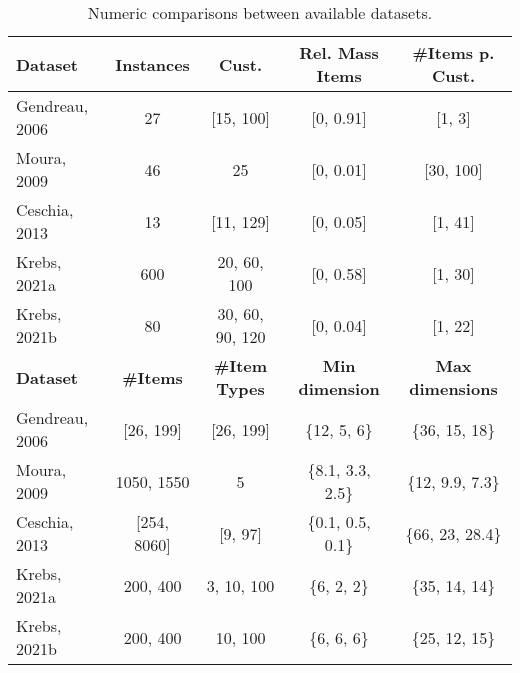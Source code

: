 \begin{table}[h]
    \centering
    \small
    \begin{tabular}{@{}lcccc@{}}
        \toprule
        \textbf{Dataset} & \textbf{Instances} & \textbf{Cust.}        & \textbf{Rel. Mass Items} & \textbf{\#Items p. Cust.} \\
        \midrule
        Gendreau, 2006   & 27                 & [15, 100]             & [0, 0.91]                & [1, 3]                    \\
        Moura, 2009      & 46                 & 25                    & [0, 0.01]                & [30, 100]                 \\
        Ceschia, 2013    & 13                 & [11, 129]             & [0, 0.05]                & [1, 41]                   \\
        Krebs, 2021a     & 600                & 20, 60, 100           & [0, 0.58]                & [1, 30]                   \\
        Krebs, 2021b     & 80                 & 30, 60, 90, 120       & [0, 0.04]                & [1, 22]                   \\
        \toprule
        \textbf{Dataset} & \textbf{\#Items}   & \textbf{\#Item Types} & \textbf{Min dimension}   & \textbf{Max dimensions}   \\
        \midrule
        Gendreau, 2006   & [26, 199]          & [26, 199]             & \{12, 5, 6\}             & \{36, 15, 18\}            \\
        Moura, 2009      & 1050, 1550         & 5                     & \{8.1, 3.3, 2.5\}        & \{12, 9.9, 7.3\}          \\
        Ceschia, 2013    & [254, 8060]        & [9, 97]               & \{0.1, 0.5, 0.1\}        & \{66, 23, 28.4\}          \\
        Krebs, 2021a     & 200, 400           & 3, 10, 100            & \{6, 2, 2\}              & \{35, 14, 14\}            \\
        Krebs, 2021b     & 200, 400           & 10, 100               & \{6, 6, 6\}              & \{25, 12, 15\}            \\
        \bottomrule
    \end{tabular}
    \caption{Numeric comparisons between available datasets.}
    \label{tab:dataset_comparison}
\end{table}

